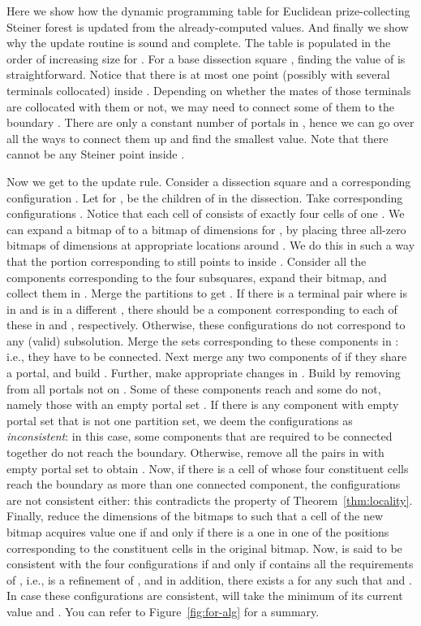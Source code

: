 \documentclass[extras,11pt]{article} \usepackage{fullpage}
\theoremstyle{mytheorem}
\begin{document}
Here we show how the dynamic programming table for Euclidean prize-collecting Steiner forest 
is updated from the already-computed values.
And finally we show why the update routine is sound and complete.
The table  is populated in the order of increasing size for .
For a base dissection square , finding the value of  is straightforward.
Notice that there is at most one point (possibly with several terminals collocated) inside .
Depending on whether the mates of those terminals are collocated with them or not, we may need to connect some of them to the boundary .
There are only a constant number of portals in , hence we can go over all the ways to connect them up and find the smallest value.
Note that there cannot be any Steiner point inside .

Now we get to the update rule.
Consider a dissection square  and a corresponding configuration .
Let  for , be the children of  in the dissection.
Take corresponding configurations .
Notice that each cell of  consists of exactly four cells of one .
We can expand a bitmap  of  to a bitmap  of dimensions  for ,
by placing three all-zero bitmaps of dimensions  at appropriate locations around .
We do this in such a way that the portion corresponding to  still points to  inside .
Consider all the components  corresponding to the four subsquares, expand their bitmap, and collect them in .
Merge the partitions  to get .
If there is a terminal pair  where  is in  and  is in a different ,
there should be a component corresponding to each of these in  and , respectively.
Otherwise, these configurations do not correspond to any (valid) subsolution.
Merge the sets corresponding to these components in : i.e., they have to be connected.
Next merge any two components of  if they share a portal, and build .
Further, make appropriate changes in .
Build   by removing from  all portals not on .
Some of these components reach  and some do not, namely those with an empty portal set .
If there is any component with empty portal set that is not  one partition set,
we deem the configurations  as \emph{inconsistent}:
in this case, some components that are required to be connected together do not reach the boundary.
Otherwise, remove all the pairs in  with empty portal set to obtain .
Now, if there is a cell of  whose four constituent cells reach the boundary as more than one connected component, the configurations are not consistent either: this contradicts the property of Theorem~\ref{thm:locality}.
Finally, reduce the dimensions of the bitmaps to  such that a cell of the new bitmap acquires value one if and only if there is a one in one of the positions corresponding to the constituent cells in the original bitmap.
Now,  is said to be consistent with the four configurations  if and only if  contains all the requirements of , i.e.,  is a refinement of , and in addition, there exists a  for any  such that  and .  In case these configurations are consistent,
  will take the minimum of its current value and .
You can refer to Figure~\ref{fig:for-alg} for a summary.
\end{document}
